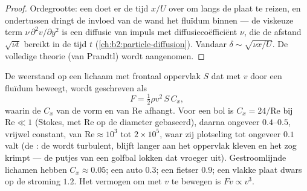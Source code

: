 \begin{proof}
Ordegrootte: een  doet er de tijd $x/U$ over om langs de plaat
te reizen, en ondertussen dringt de invloed van de wand het fluïdum binnen
--- de viskeuze term $\nu\,\partial^2v/\partial y^2$ is een diffusie van
impuls met diffusiecoëfficiënt $\nu$, die de afstand
$\sqrt{\nu t}$ bereikt in de tijd $t$ (\cref{ch:b2:particle-diffusion}). Vandaar
$\delta \sim \sqrt{\nu x
/U}$. De volledige theorie (van Prandtl) wordt
aangenomen.
\end{proof}

\begin{proposition}\label{prop:b2:viscous-flows:drag}
De weerstand op een lichaam met frontaal oppervlak $S$ dat met $v$ door een
fluïdum beweegt, wordt geschreven als
\[
F = \tfrac12\rho v^2\,S\,C_x ,
\]
waarin de \emph{} $C_x$ van de vorm en van
$\mathrm{Re}$ afhangt. Voor een bol is $C_x = 24/\mathrm{Re}$ bij
$\mathrm{Re} \ll 1$ (Stokes, met $\mathrm{Re}$ op de diameter gebaseerd),
daarna ongeveer $0.4$--$0.5$, vrijwel constant, van
$\mathrm{Re} \approx 10^3$ tot $2 \times 10^5$, waar zij plotseling tot
ongeveer $0.1$ valt (de \emph{}: de  wordt
turbulent, blijft langer aan het oppervlak kleven en het zog krimpt --- de
putjes van een golfbal lokken dat vroeger uit). Gestroomlijnde lichamen
hebben $C_x \approx 0.05$; een auto $0.3$; een fietser $0.9$; een vlakke
plaat dwars op de stroming $1.2$. Het vermogen om met $v$ te bewegen is
$Fv \propto v^3$.
\end{proposition}
\admitted

